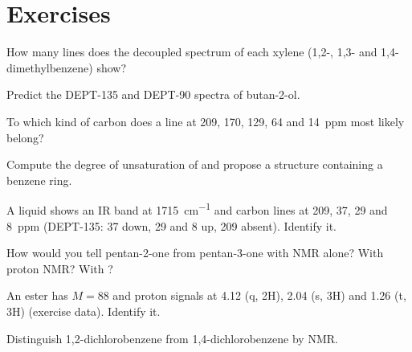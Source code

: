 \section{Exercises}

\begin{exercise}[$\star$]\label{exo:b2:structure-determination:1}
How many lines does the decoupled  spectrum of each xylene (1,2-, 1,3- and
1,4-dimethylbenzene) show?
\end{exercise}

\begin{exercise}[$\star$]\label{exo:b2:structure-determination:2}
Predict the DEPT-135 and DEPT-90 spectra of butan-2-ol.
\end{exercise}

\begin{exercise}[$\star$]\label{exo:b2:structure-determination:3}
To which kind of carbon does a line at 209, 170, 129, 64 and 14~ppm most likely belong?
\end{exercise}

\begin{exercise}[$\star$]\label{exo:b2:structure-determination:4}
Compute the degree of unsaturation of  and propose a structure containing a benzene ring.
\end{exercise}

\begin{exercise}[$\star\star$]\label{exo:b2:structure-determination:5}
A liquid  shows an IR band at \qty{1715}{cm^{-1}} and carbon lines at 209, 37, 29 and 8~ppm
(DEPT-135: 37 down, 29 and 8 up, 209 absent). Identify it.
\end{exercise}

\begin{exercise}[$\star\star$]\label{exo:b2:structure-determination:6}
How would you tell pentan-2-one from pentan-3-one with  NMR alone? With proton NMR? With
?
\end{exercise}

\begin{exercise}[$\star\star$]\label{exo:b2:structure-determination:7}
An ester has $M = 88$ and proton signals at 4.12 (q, 2H), 2.04 (s, 3H) and 1.26 (t, 3H) (exercise
data). Identify it.
\end{exercise}

\begin{exercise}[$\star\star$]\label{exo:b2:structure-determination:8}
Distinguish 1,2-dichlorobenzene from 1,4-dichlorobenzene by  NMR.
\end{exercise}

